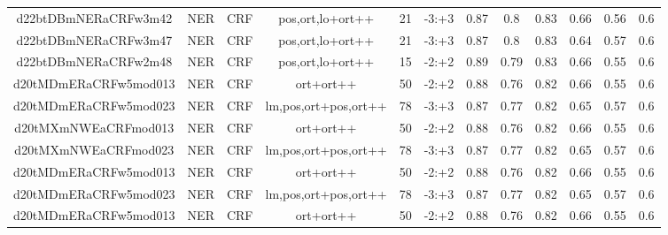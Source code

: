 \documentclass[a4paper]{article}
\begin{document}
\begin{landscape}
\begin{center}
\begin{tabular}{ |c|c|c|c|c|c|c|c|c|c|c|c|}
 
 	
 	\small{ d22btDBmNERaCRFw3m42 } & \small{ NER} & \small{  CRF }  & pos,ort,lo+ort++  &  21 &  \small{  -3:+3 }  &  0.87 & 0.8 & 0.83  &  0.66 & 0.56 & 0.6 \\
 	

 
 	
 	\small{ d22btDBmNERaCRFw3m47 } & \small{ NER} & \small{  CRF }  & pos,ort,lo+ort++  &  21 &  \small{  -3:+3 }  &  0.87 & 0.8 & 0.83  &  0.64 & 0.57 & 0.6 \\
 	

 
 	
 	\small{ d22btDBmNERaCRFw2m48 } & \small{ NER} & \small{  CRF }  & pos,ort,lo+ort++  &  15 &  \small{  -2:+2 }  &  0.89 & 0.79 & 0.83  &  0.66 & 0.55 & 0.6 \\
 	

 
 	
 	\small{ d20tMDmERaCRFw5mod013 } & \small{ NER} & \small{  CRF }  & ort+ort++  &  50 &  \small{  -2:+2 }  &  0.88 & 0.76 & 0.82  &  0.66 & 0.55 & 0.6 \\
 	

 
 	
 	\small{ d20tMDmERaCRFw5mod023 } & \small{ NER} & \small{  CRF }  & lm,pos,ort+pos,ort++  &  78 &  \small{  -3:+3 }  &  0.87 & 0.77 & 0.82  &  0.65 & 0.57 & 0.6 \\
 	

 
 	
 	\small{ d20tMXmNWEaCRFmod013 } & \small{ NER} & \small{  CRF }  & ort+ort++  &  50 &  \small{  -2:+2 }  &  0.88 & 0.76 & 0.82  &  0.66 & 0.55 & 0.6 \\
 	

 
 	
 	\small{ d20tMXmNWEaCRFmod023 } & \small{ NER} & \small{  CRF }  & lm,pos,ort+pos,ort++  &  78 &  \small{  -3:+3 }  &  0.87 & 0.77 & 0.82  &  0.65 & 0.57 & 0.6 \\
 	

 
 	
 	\small{ d20tMDmERaCRFw5mod013 } & \small{ NER} & \small{  CRF }  & ort+ort++  &  50 &  \small{  -2:+2 }  &  0.88 & 0.76 & 0.82  &  0.66 & 0.55 & 0.6 \\
 	

 
 	
 	\small{ d20tMDmERaCRFw5mod023 } & \small{ NER} & \small{  CRF }  & lm,pos,ort+pos,ort++  &  78 &  \small{  -3:+3 }  &  0.87 & 0.77 & 0.82  &  0.65 & 0.57 & 0.6 \\
 	

 
 	
 	\small{ d20tMDmERaCRFw5mod013 } & \small{ NER} & \small{  CRF }  & ort+ort++  &  50 &  \small{  -2:+2 }  &  0.88 & 0.76 & 0.82  &  0.66 & 0.55 & 0.6 \\
 	


\end{tabular}
\end{center}
\end{landscape}
\end{document}
